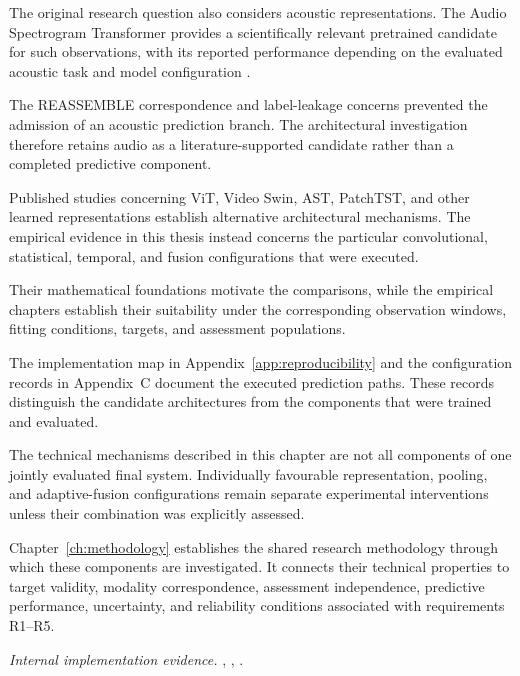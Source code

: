 The original research question also considers acoustic representations. The Audio Spectrogram Transformer provides a scientifically relevant pretrained candidate for such observations, with its reported performance depending on the evaluated acoustic task and model configuration \parencite{P011}.

The REASSEMBLE correspondence and label-leakage concerns prevented the admission of an acoustic prediction branch. The architectural investigation therefore retains audio as a literature-supported candidate rather than a completed predictive component.

Published studies concerning ViT, Video Swin, AST, PatchTST, and other learned representations establish alternative architectural mechanisms. The empirical evidence in this thesis instead concerns the particular convolutional, statistical, temporal, and fusion configurations that were executed.

Their mathematical foundations motivate the comparisons, while the empirical chapters establish their suitability under the corresponding observation windows, fitting conditions, targets, and assessment populations.

The implementation map in Appendix~\ref{app:reproducibility} and the configuration records in Appendix~C document the executed prediction paths. These records distinguish the candidate architectures from the components that were trained and evaluated.

The technical mechanisms described in this chapter are not all components of one jointly evaluated final system. Individually favourable representation, pooling, and adaptive-fusion configurations remain separate experimental interventions unless their combination was explicitly assessed.

Chapter~\ref{ch:methodology} establishes the shared research methodology through which these components are investigated. It connects their technical properties to target validity, modality correspondence, assessment independence, predictive performance, uncertainty, and reliability conditions associated with requirements R1–R5.

\noindent\textit{Internal implementation evidence.} , , .
